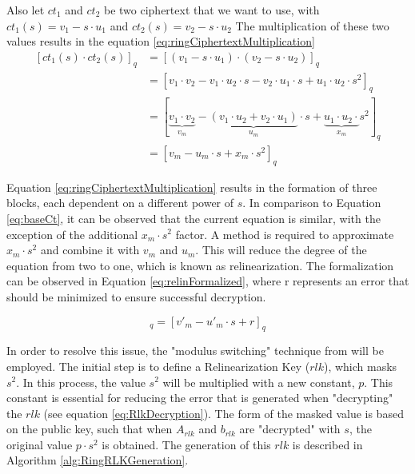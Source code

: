 Also let $ct_1$ and $ct_2$ be two ciphertext that we want to use, with $ct_1(s) = v_1-s\cdot u_1$ and $ct_2(s) = v_2-s\cdot u_2$
The multiplication of these two values results in the equation \ref{eq:ringCiphertextMultiplication}
\begin{equation}
  \begin{split}
    [ct_1(s)\cdot ct_2(s)]_q & = [(v_1-s\cdot u_1) \cdot (v_2-s\cdot u_2)]_q                                                                                              \\
                             & = [v_1\cdot v_2 - v_1\cdot u_2 \cdot s- v_2\cdot u_1\cdot s + u_1\cdot u_2\cdot s^2]_q                                                     \\
                             & = [\underbrace{v_1\cdot v_2}_{v_m} - \underbrace{(v_1\cdot u_2 + v_2\cdot u_1)}_{u_m}\cdot s + \underbrace{u_1\cdot u_2\cdot}_{x_m} s^2]_q \\
                             & = [v_m - u_m\cdot s + x_m \cdot s^2]_q
  \end{split}
  \label{eq:ringCiphertextMultiplication}
\end{equation}

Equation \ref{eq:ringCiphertextMultiplication} results in the formation of three blocks, each dependent on a different power of $s$. In comparison to Equation \ref{eq:baseCt}, it can be observed that the current equation is similar, with the exception of the additional $x_m\cdot s^2$ factor. 
A method is required to approximate $x_m\cdot s^2$ and combine it with $v_m$ and $u_m$. This will reduce the degree of the equation from two to one, which is known as relinearization. The formalization can be observed in Equation \ref{eq:relinFormalized}, where r represents an error that should be minimized to ensure successful decryption.

\begin{equation}
  [v_m - u_m\cdot s + x_m \cdot s^2]_q = [v'_m - u'_m\cdot s + r]_q
  \label{eq:relinFormalized}
\end{equation}

In order to resolve this issue, the "modulus switching" technique from \cite{bfv} will be employed. The initial step is to define a Relinearization Key ($rlk$), which masks $s^2$. In this process, the value $s^2$ will be multiplied with a new constant, $p$. This constant is essential for reducing the error that is generated when "decrypting" the $rlk$ (see equation \ref{eq:RlkDecryption}).
The form of the masked value is based on the public key, such that when $A_{rlk}$ and $b_{rlk}$ are "decrypted" with $s$, the original value $p\cdot s^2$ is obtained. The generation of this $rlk$ is described in Algorithm \ref{alg:RingRLKGeneration}.

